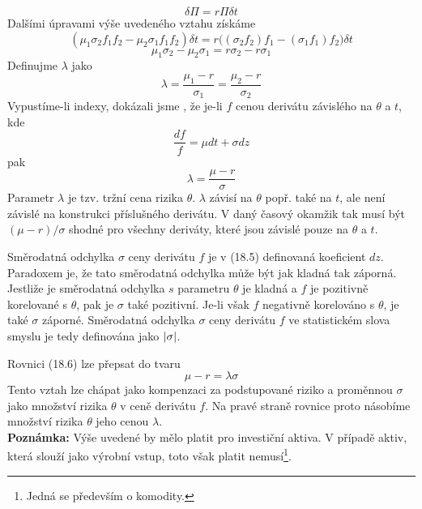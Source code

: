 \documentclass[a4paper]{book}
\begin{document}
\begin{equation*}
\delta \Pi = r \Pi \delta t
\end{equation*}
Dalšími úpravami výše uvedeného vztahu získáme
\begin{equation*}
(\mu_1 \sigma_2 f_1 f_2 - \mu_2 \sigma_1 f_1 f_2)\delta t = r\bigg((\sigma_2 f_2)f_1 - (\sigma_1 f_1)f_2 \bigg) \delta t
\end{equation*}
\begin{equation*}
\mu_1 \sigma_2 - \mu_2 \sigma_1 = r \sigma_2 - r \sigma_1
\end{equation*}
Definujme $\lambda$ jako
\begin{equation*}
\lambda = \frac{\mu_1 - r}{\sigma_1} = \frac{\mu_2 - r}{\sigma_2}
\end{equation*}
Vypustíme-li indexy, dokázali jsme , že je-li $f$ cenou derivátu závislého na $\theta$ a $t$, kde
\begin{equation}
\frac{d f}{f}=\mu dt + \sigma dz
\end{equation}
pak
\begin{equation}
\lambda = \frac{\mu - r}{\sigma}
\end{equation}
Parametr $\lambda$ je tzv. tržní cena rizika $\theta$. $\lambda$ závisí na $\theta$ popř. také na $t$, ale není závislé na konstrukci příslušného derivátu. V daný časový okamžik tak musí být $(\mu - r)/\sigma$ shodné pro všechny deriváty, které jsou závislé pouze na $\theta$ a $t$.

Směrodatná odchylka $\sigma$ ceny derivátu $f$ je v (18.5) definovaná koeficient $dz$. Paradoxem je, že tato směrodatná odchylka může být jak kladná tak záporná. Jestliže je směrodatná odchylka $s$ parametru $\theta$ je kladná a $f$ je pozitivně korelované s $\theta$, pak je $\sigma$ také pozitivní. Je-li však $f$ negativně korelováno s $\theta$, je také $\sigma$ záporné. Směrodatná odchylka $\sigma$ ceny derivátu $f$ ve statistickém slova smyslu je tedy definována jako $\arrowvert \sigma \arrowvert$.

Rovnici (18.6) lze přepsat do tvaru
\begin{equation*}
\mu - r = \lambda \sigma
\end{equation*}
Tento vztah lze chápat jako kompenzaci za podstupované riziko a proměnnou $\sigma$ jako množství rizika $\theta$ v ceně derivátu $f$. Na pravé straně rovnice proto násobíme množství rizika $\theta$ jeho cenou $\lambda$.\\

\noindent \textbf{Poznámka:} Výše uvedené by mělo platit pro investiční aktiva. V případě aktiv, která slouží jako výrobní vstup, toto však platit nemusí\footnote{Jedná se především o komodity.}.\\
\end{document}
